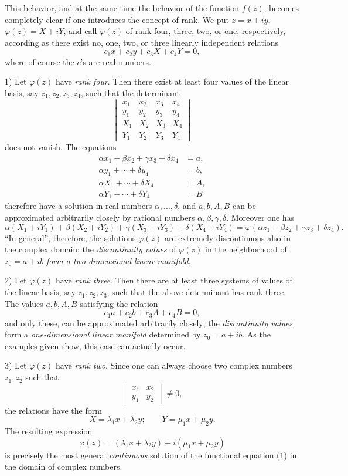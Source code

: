 This behavior, and at the same time the behavior of the function \(f(z)\), becomes completely clear if one introduces the concept of rank. We put \(z=x+iy\), \(\varphi(z)=X+iY\), and call \(\varphi(z)\) of rank four, three, two, or one, respectively, according as there exist no, one, two, or three linearly independent relations
\[
c_1x+c_2y+c_3X+c_4Y=0,
\]
where of course the \(c\)'s are real numbers.

1) Let \(\varphi(z)\) have \emph{rank four}. Then there exist at least four values of the linear basis, say \(z_1,z_2,z_3,z_4\), such that the determinant
\[
\begin{vmatrix}
x_1&x_2&x_3&x_4\\
y_1&y_2&y_3&y_4\\
X_1&X_2&X_3&X_4\\
Y_1&Y_2&Y_3&Y_4
\end{vmatrix}
\]
does not vanish. The equations
\[
\begin{aligned}
\alpha x_1+\beta x_2+\gamma x_3+\delta x_4&=a,\\
\alpha y_1+\cdots+\delta y_4&=b,\\
\alpha X_1+\cdots+\delta X_4&=A,\\
\alpha Y_1+\cdots+\delta Y_4&=B
\end{aligned}
\]
therefore have a solution in real numbers \(\alpha,\ldots,\delta\), and \(a,b,A,B\) can be approximated arbitrarily closely by rational numbers \(\alpha,\beta,\gamma,\delta\). Moreover one has
\[
\alpha(X_1+iY_1)+\beta(X_2+iY_2)+\gamma(X_3+iY_3)+\delta(X_4+iY_4)
 =\varphi(\alpha z_1+\beta z_2+\gamma z_3+\delta z_4).
\]
``In general'', therefore, the solutions \(\varphi(z)\) are extremely discontinuous also in the complex domain; the \emph{discontinuity values} of \(\varphi(z)\) in the neighborhood of \(z_0=a+ib\) \emph{form a two-dimensional linear manifold}.

2) Let \(\varphi(z)\) have \emph{rank three}. Then there are at least three systems of values of the linear basis, say \(z_1,z_2,z_3\), such that the above determinant has rank three. The values \(a,b,A,B\) satisfying the relation
\[
c_1a+c_2b+c_3A+c_4B=0,
\]
and only these, can be approximated arbitrarily closely; the \emph{discontinuity values} form a \emph{one-dimensional linear manifold} determined by \(z_0=a+ib\). As the examples given show, this case can actually occur.

3) Let \(\varphi(z)\) have \emph{rank two}. Since one can always choose two complex numbers \(z_1,z_2\) such that
\[
\begin{vmatrix}x_1&x_2\\ y_1&y_2\end{vmatrix}\ne0,
\]
the relations have the form
\[
X=\lambda_1x+\lambda_2y;\qquad Y=\mu_1x+\mu_2y.
\]
The resulting expression
\[
\varphi(z)=(\lambda_1x+\lambda_2y)+i(\mu_1x+\mu_2y)
\]
is precisely the most general \emph{continuous} solution of the functional equation (1) in the domain of complex numbers.

